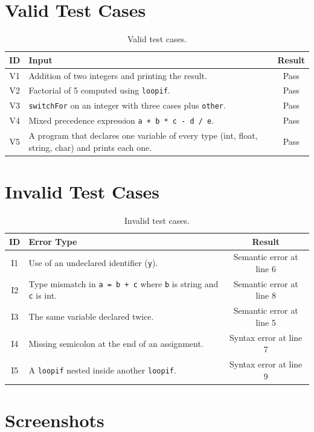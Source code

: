 \documentclass[12pt,a4paper]{report}
\begin{document}
\section{Valid Test Cases}

\begin{table}[H]
\centering
\begin{tabular}{|c|p{8cm}|c|}
\hline
\textbf{ID} & \textbf{Input} & \textbf{Result} \\
\hline
V1 & Addition of two integers and printing the result. & Pass \\
V2 & Factorial of 5 computed using \texttt{loopif}. & Pass \\
V3 & \texttt{switchFor} on an integer with three cases plus \texttt{other}. & Pass \\
V4 & Mixed precedence expression \texttt{a + b * c - d / e}. & Pass \\
V5 & A program that declares one variable of every type (int, float, string, char) and prints each one. & Pass \\
\hline
\end{tabular}
\caption{Valid test cases.}
\end{table}

\section{Invalid Test Cases}

\begin{table}[H]
\centering
\begin{tabular}{|c|p{8cm}|c|}
\hline
\textbf{ID} & \textbf{Error Type} & \textbf{Result} \\
\hline
I1 & Use of an undeclared identifier (\texttt{y}). & Semantic error at line 6 \\
I2 & Type mismatch in \texttt{a = b + c} where \texttt{b} is string and \texttt{c} is int. & Semantic error at line 8 \\
I3 & The same variable declared twice. & Semantic error at line 5 \\
I4 & Missing semicolon at the end of an assignment. & Syntax error at line 7 \\
I5 & A \texttt{loopif} nested inside another \texttt{loopif}. & Syntax error at line 9 \\
\hline
\end{tabular}
\caption{Invalid test cases.}
\end{table}

\section{Screenshots}
\end{document}
